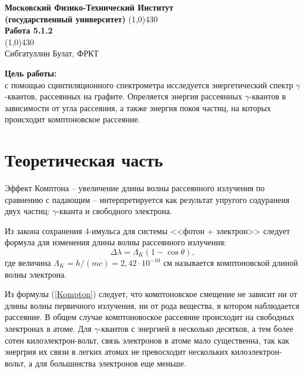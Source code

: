 \documentclass[a4paper, 12pt]{article}%
\begin{document}
\begin{titlepage}

\begin{center}
\large\textbf{Московский Физико-Технический Институт}\\
\large\textbf{(государственный университет)}
\vfill
\line(1,0){430}\\[1mm]
\huge\textbf{Работа 5.1.2}\\
\line(1,0){430}\\[1mm]
\vfill
\large Сибгатуллин Булат, ФРКТ\\
\end{center}

\end{titlepage}
\noindent \textbf{Цель работы: } \\
\indent с помощью сцинтиляционного спектрометра исследуется энергетический спектр $\gamma$-квантов, рассеянных на графите. Опреляется энергия рассеянных $\gamma$-квантов в зависимости от угла рассеяния, а также энергия покоя частиц, на которых происходит комптоновское рассеяние.

\section{Теоретическая часть}
	Эффект Комптона -- увеличение длины волны рассеянного излучения по сравнению с падающим -- интерпретируется как результат упругого содуранеия двух частиц: $\gamma$-кванта и свободного электрона.
	
	Из закона сохранения 4-имульса для системы <<фотон + электрон>> следует формула для изменения длины волны рассеянного излучения:
	\begin{equation}\label{Kompton}
		\Delta \lambda = \Lambda_K(1-\cos\theta),
	\end{equation}
	где величина $\Lambda_K = h/(mc) = 2,42 \cdot 10^{-10}$ см называется комптоновской длиной волны электрона.
	
	Из формулы (\ref{Kompton}) следует, что комптоновское смещение не зависит ни от длины волны первичного излучения, ни от рода вещества, в котором наблюдается рассеяние. В общем случае комптоновоское рассеяние происходит на свободных электронах в атоме. Для $\gamma$-квантов с энергией в несколько десятков, а тем более сотен килоэлектрон-вольт, связь электронов в атоме мало существенна, так как энергрия их связи в легких атомах не превосходит нескольких килоэлектрон-вольт, а для большинства электронов еще меньше.
	
\end{document}
